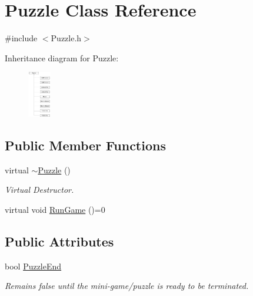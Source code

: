 \hypertarget{classPuzzle}{\section{Puzzle Class Reference}
\label{classPuzzle}
}


{\ttfamily \#include $<$Puzzle.\-h$>$}

Inheritance diagram for Puzzle\-:\begin{figure}[H]
\begin{center}
\leavevmode
\includegraphics[height=2.000000cm]{classPuzzle}
\end{center}
\end{figure}
\subsection*{Public Member Functions}
\begin{DoxyCompactItemize}
\item 
virtual \hyperlink{classPuzzle_a4319df1536a07cd1aaf23b27aeb53579}{$\sim$\-Puzzle} ()
\begin{DoxyCompactList}\small\item\em Virtual Destructor. \end{DoxyCompactList}\item 
virtual void \hyperlink{classPuzzle_ac92d0a3389cc806c0334aa224b72fa78}{Run\-Game} ()=0
\end{DoxyCompactItemize}
\subsection*{Public Attributes}
\begin{DoxyCompactItemize}
\item 
bool \hyperlink{classPuzzle_a965ad54e9f7340c3cad944fc82c61a2b}{Puzzle\-End}
\begin{DoxyCompactList}\small\item\em Remains false until the mini-\/game/puzzle is ready to be terminated. \end{DoxyCompactList}\end{DoxyCompactItemize}
